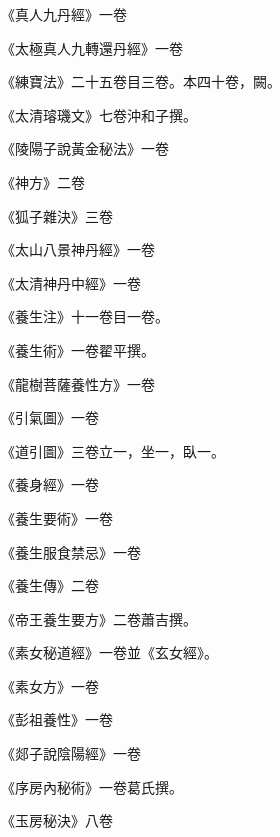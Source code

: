 \begin{pinyinscope}
 《真人九丹經》一卷



 《太極真人九轉還丹經》一卷



 《練寶法》二十五卷目三卷。本四十卷，闕。



 《太清璿璣文》七卷沖和子撰。



 《陵陽子說黃金秘法》一卷



 《神方》二卷



 《狐子雜決》三卷



 《太山八景神丹經》一卷



 《太清神丹中經》一卷



 《養生注》十一卷目一卷。



 《養生術》一卷翟平撰。



 《龍樹菩薩養性方》一卷



 《引氣圖》一卷



 《道引圖》三卷立一，坐一，臥一。



 《養身經》一卷



 《養生要術》一卷



 《養生服食禁忌》一卷



 《養生傳》二卷



 《帝王養生要方》二卷蕭吉撰。



 《素女秘道經》一卷並《玄女經》。



 《素女方》一卷



 《彭祖養性》一卷



 《郯子說陰陽經》一卷



 《序房內秘術》一卷葛氏撰。



 《玉房秘決》八卷




\end{pinyinscope}
